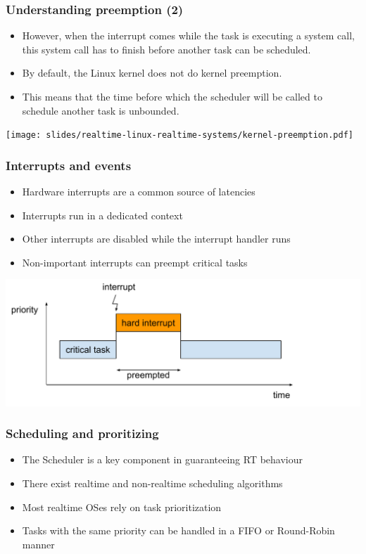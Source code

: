 \begin{frame}
  \frametitle{Understanding preemption (2)}
  \begin{itemize}
  \item However, when the interrupt comes while the task is executing
    a system call, this system call has to finish before another task
    can be scheduled.
  \item By default, the Linux kernel does not do kernel preemption.
  \item This means that the time before which the scheduler will be
    called to schedule another task is unbounded.
  \end{itemize}
  \begin{center}
    \texttt{[image: slides/realtime-linux-realtime-systems/kernel-preemption.pdf]}
  \end{center}
\end{frame}


\begin{frame}
  \frametitle{Interrupts and events}
	\begin{itemize}
		\item Hardware interrupts are a common source of latencies
		\item Interrupts run in a dedicated context
		\item Other interrupts are disabled while the interrupt handler runs
		\item Non-important interrupts can preempt critical tasks
	\end{itemize}
	\includegraphics[height=0.5\textheight]{slides/realtime-linux-realtime-systems/irq_preemption.pdf}
\end{frame}

\begin{frame}
  \frametitle{Scheduling and proritizing}
	\begin{itemize}
		\item The Scheduler is a key component in guaranteeing RT behaviour
		\item There exist realtime and non-realtime scheduling algorithms
		\item Most realtime OSes rely on task prioritization
		\item Tasks with the same priority can be handled in a FIFO or Round-Robin manner
	\end{itemize}
\end{frame}

